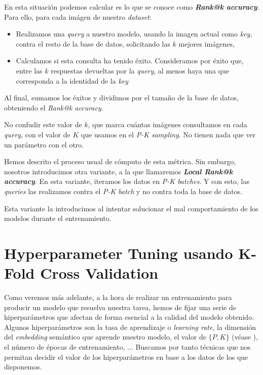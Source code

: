 En esta situación podemos calcular es lo que se conoce como \textbf{\textit{Rank@k accuracy}}. Para ello, para cada imágen de nuestro \textit{dataset}:

\begin{itemize}
    \item Realizamos una \textit{query} a nuestro modelo, usando la imagen actual como \textit{key}, contra el resto de la base de datos, solicitando las $k$ mejores imágenes,
    \item Calculamos si esta consulta ha tenido éxito. Consideramos por éxito que, entre las $k$ respuestas devueltas por la \textit{query}, al menos haya una que corresponda a la identidad de la \textit{key}
\end{itemize}

Al final, sumamos los éxitos y dividimos por el tamaño de la base de datos, obteniendo el \textit{Rank@k accuracy}.

\begin{observacion}

    No confudir este valor de $k$, que marca cuántas imágenes consultamos en cada \textit{query}, con el valor de $K$ que usamos en el \textit{P-K sampling}. No tienen nada que ver un parámetro con el otro.

\end{observacion}

\begin{observacion}

    Hemos descrito el proceso usual de cómputo de esta métrica. Sin embargo, nosotros introducimos otra variante, a la que llamaremos \textbf{\textit{Local Rank@k accuracy}}. En esta variante, iteramos los datos en \textit{P-K batches}. Y con esto, las \textit{queries} las realizamos contra el \textit{P-K batch} y no contra toda la base de datos.

    Esta variante la introducimos al intentar solucionar el mal comportamiento de los modelos durante el entrenamiento.

\end{observacion}

\section{Hyperparameter Tuning usando K-Fold Cross Validation} \label{isec:hptuning_kfold_cross_validation}

Como veremos más adelante, a la hora de realizar un entrenamiento para producir un modelo que resuelva nuestra tarea, hemos de fijar una serie de hiperparámetros que afectan de forma esencial a la calidad del modelo obtenido. Algunos hiperparámetros son la tasa de aprendizaje o \textit{learning rate}, la dimensión del \textit{embedding} semántico que aprende nuestro modelo, el valor de $\{P, K\}$ (véase ), el número de épocas de entrenamiento, ... Buscamos por tanto técnicas que nos permitan decidir el valor de los hiperparámetros en base a los datos de los que disponemos.

